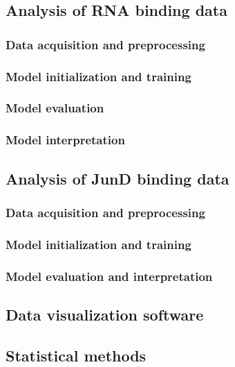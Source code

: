 \subsection{Analysis of RNA binding data}

\subsubsection{Data acquisition and preprocessing}

\subsubsection{Model initialization and training}

\subsubsection{Model evaluation}

\subsubsection{Model interpretation}

\subsection{Analysis of JunD binding data}

\subsubsection{Data acquisition and preprocessing}

\subsubsection{Model initialization and training}

\subsubsection{Model evaluation and interpretation}

\subsection{Data visualization software}

\subsection{Statistical methods}

